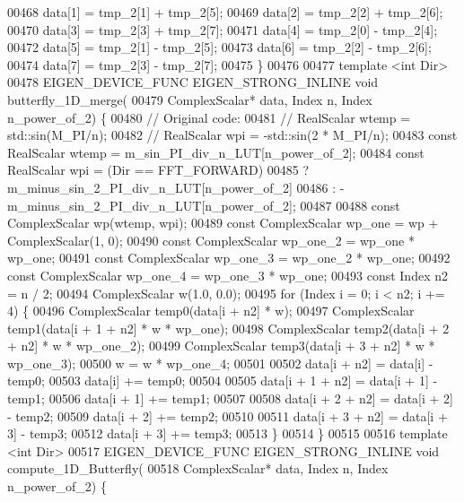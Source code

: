 \begin{DoxyCode}
00468     data[1] = tmp\_2[1] + tmp\_2[5];
00469     data[2] = tmp\_2[2] + tmp\_2[6];
00470     data[3] = tmp\_2[3] + tmp\_2[7];
00471     data[4] = tmp\_2[0] - tmp\_2[4];
00472     data[5] = tmp\_2[1] - tmp\_2[5];
00473     data[6] = tmp\_2[2] - tmp\_2[6];
00474     data[7] = tmp\_2[3] - tmp\_2[7];
00475   \}
00476 
00477   \textcolor{keyword}{template} <\textcolor{keywordtype}{int} Dir>
00478   EIGEN\_DEVICE\_FUNC EIGEN\_STRONG\_INLINE \textcolor{keywordtype}{void} butterfly\_1D\_merge(
00479       ComplexScalar* data, Index n, Index n\_power\_of\_2) \{
00480     \textcolor{comment}{// Original code:}
00481     \textcolor{comment}{// RealScalar wtemp = std::sin(M\_PI/n);}
00482     \textcolor{comment}{// RealScalar wpi =  -std::sin(2 * M\_PI/n);}
00483     \textcolor{keyword}{const} RealScalar wtemp = m\_sin\_PI\_div\_n\_LUT[n\_power\_of\_2];
00484     \textcolor{keyword}{const} RealScalar wpi = (Dir == FFT\_FORWARD)
00485                                ? m\_minus\_sin\_2\_PI\_div\_n\_LUT[n\_power\_of\_2]
00486                                : -m\_minus\_sin\_2\_PI\_div\_n\_LUT[n\_power\_of\_2];
00487 
00488     \textcolor{keyword}{const} ComplexScalar wp(wtemp, wpi);
00489     \textcolor{keyword}{const} ComplexScalar wp\_one = wp + ComplexScalar(1, 0);
00490     \textcolor{keyword}{const} ComplexScalar wp\_one\_2 = wp\_one * wp\_one;
00491     \textcolor{keyword}{const} ComplexScalar wp\_one\_3 = wp\_one\_2 * wp\_one;
00492     \textcolor{keyword}{const} ComplexScalar wp\_one\_4 = wp\_one\_3 * wp\_one;
00493     \textcolor{keyword}{const} Index n2 = n / 2;
00494     ComplexScalar w(1.0, 0.0);
00495     \textcolor{keywordflow}{for} (Index i = 0; i < n2; i += 4) \{
00496        ComplexScalar temp0(data[i + n2] * w);
00497        ComplexScalar temp1(data[i + 1 + n2] * w * wp\_one);
00498        ComplexScalar temp2(data[i + 2 + n2] * w * wp\_one\_2);
00499        ComplexScalar temp3(data[i + 3 + n2] * w * wp\_one\_3);
00500        w = w * wp\_one\_4;
00501 
00502        data[i + n2] = data[i] - temp0;
00503        data[i] += temp0;
00504 
00505        data[i + 1 + n2] = data[i + 1] - temp1;
00506        data[i + 1] += temp1;
00507 
00508        data[i + 2 + n2] = data[i + 2] - temp2;
00509        data[i + 2] += temp2;
00510 
00511        data[i + 3 + n2] = data[i + 3] - temp3;
00512        data[i + 3] += temp3;
00513     \}
00514   \}
00515 
00516  \textcolor{keyword}{template} <\textcolor{keywordtype}{int} Dir>
00517   EIGEN\_DEVICE\_FUNC EIGEN\_STRONG\_INLINE \textcolor{keywordtype}{void} compute\_1D\_Butterfly(
00518       ComplexScalar* data, Index n, Index n\_power\_of\_2) \{

\end{DoxyCode}
